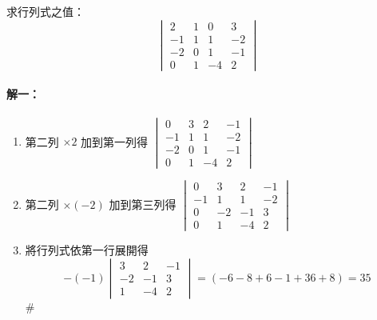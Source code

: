 \begin{example}\label{ex:b6-1-29}
求行列式之值：
\[ \begin{vmatrix}
2 & 1 & 0 & 3 \\
-1 & 1 & 1 & -2 \\
-2 & 0 & 1 & -1 \\
0 & 1 & -4 & 2
\end{vmatrix} \]
\end{example}

\paragraph{解一：}
\begin{enumerate}[label=(\roman*)]
  \item 第二列 $\times 2$ 加到第一列得 $\begin{vmatrix} 0 & 3 & 2 & -1 \\ -1 & 1 & 1 & -2 \\ -2 & 0 & 1 & -1 \\ 0 & 1 & -4 & 2 \end{vmatrix}$
  \item 第二列 $\times (-2)$ 加到第三列得 $\begin{vmatrix} 0 & 3 & 2 & -1 \\ -1 & 1 & 1 & -2 \\ 0 & -2 & -1 & 3 \\ 0 & 1 & -4 & 2 \end{vmatrix}$
  \item 將行列式依第一行展開得
  \[ -(-1) \begin{vmatrix} 3 & 2 & -1 \\ -2 & -1 & 3 \\ 1 & -4 & 2 \end{vmatrix} = (-6-8+6-1+36+8) = 35 \]\hfill$\#$
\end{enumerate}

